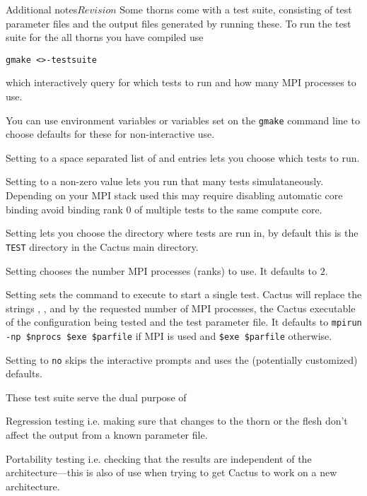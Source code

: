 \begin{cactuspart}{Additional notes}{}{$Revision$}
Some thorns come with a test suite, consisting of test parameter files
and the output files generated by running these. To run the test suite
for the all thorns you have compiled use

\texttt{gmake <>-testsuite}

which interactively query for which tests to run and how many MPI processes
to use.

You can use environment variables or variables set on the \texttt{gmake}
command line to choose defaults for these for non-interactive use.

Setting  to a space separated list of
 and  entries lets you choose which tests to run.

Setting  to a non-zero value lets
you run that many tests simulataneously. Depending on your MPI stack
used this may require disabling automatic core binding avoid binding
rank 0 of multiple tests to the same compute core.

Setting  lets you choose the directory where tests are run
in, by default this is the \texttt{TEST} directory in the Cactus main
directory.

Setting  chooses the number MPI
processes (ranks) to use. It defaults to $2$.

Setting  sets the command to execute to
start a single test. Cactus will replace the strings ,
, and  by the requested number of MPI processes,
the Cactus executable of the configuration being tested and the test
parameter file. It defaults to \texttt{mpirun -np \$nprocs \$exe \$parfile}
if MPI is used and \texttt{\$exe \$parfile} otherwise.

Setting  to \texttt{no} skips the interactive prompts and uses
the (potentially customized) defaults.

These test suite serve the dual purpose of

\begin{Lentry}
\item [Regression testing]
i.e. making sure that changes to the thorn or the flesh don't affect the
output from a known parameter file.
\item [Portability testing]
i.e. checking that the results are independent of the architecture---this
is also of use when trying to get Cactus to work on a new architecture.
\end{Lentry}


\end{cactuspart}
